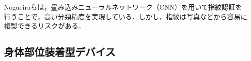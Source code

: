 \documentclass[Japanese,noauthor]{dicomopapers}
\begin{document}
Nogueiraら\cite{finger_CNN}は，畳み込みニューラルネットワーク（CNN）を用いて指紋認証を行うことで，高い分類精度を実現している．しかし，指紋は写真などから容易に複製できるリスクがある．\par




\subsection{身体部位装着型デバイス}
\end{document}
